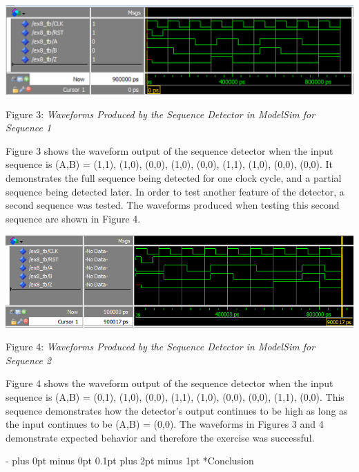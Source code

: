 \documentclass[\FontSize\FontUnit,letterpaper,oneside]{article}
\makeatletter
\renewcommand \section{
    \@startsection{section}{1}{\z@}
      {\dimexpr \FontSize\FontUnit * 2 - \parskip \relax plus 0pt minus 0pt}
      {0.1pt plus 2pt minus 1pt} %
      {\normalfont\normalsize\bfseries}}
\makeatother
\begin{document}
\begin{center}
  \includegraphics[scale=0.86]{theirwaves.png}
\end{center}
\begin{center}
  Figure 3: \textit{Waveforms Produced by the Sequence Detector in ModelSim for Sequence 1}
\end{center}


Figure 3 shows the waveform output of the sequence detector when the input sequence is 
(A,B) = (1,1), (1,0), (0,0), (1,0), (0,0), (1,1), (1,0), (0,0), (0,0). It demonstrates the
full sequence being detected for one clock cycle, and a partial sequence being detected later.
In order to test another feature of the detector, a second sequence was tested. The waveforms
produced when testing this second sequence are shown in Figure 4.

\begin{center}
  \includegraphics[scale=0.8]{ownwaves.png}
\end{center}
\begin{center}
  Figure 4: \textit{Waveforms Produced by the Sequence Detector in ModelSim for Sequence 2}
\end{center}

Figure 4 shows the waveform output of the sequence detector when the input sequence is
(A,B) = (0,1), (1,0), (0,0), (1,1), (1,0), (0,0), (0,0), (1,1), (0,0). This sequence
demonstrates how the detector's output continues to be high as long as the input continues
to be (A,B) = (0,0). The waveforms in Figures 3 and 4 demonstrate expected behavior and therefore
the exercise was successful.

\section*{Conclusion}
\end{document}
